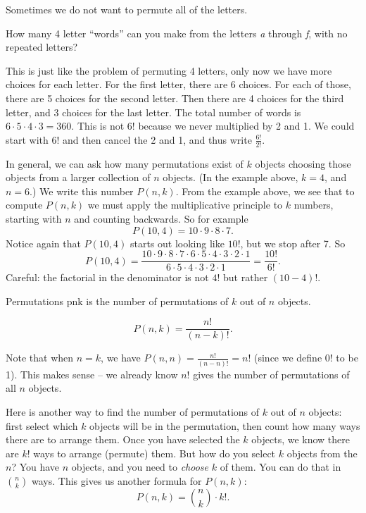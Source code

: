 \documentclass[12pt]{article}
\begin{document}
Sometimes we do not want to permute all of the letters.

\begin{example}
  How many 4 letter ``words'' can you make from the letters \textit{a} through \textit{f}, with no repeated letters?
  \begin{solution}
    This is just like the problem of permuting 4 letters, only now we have more choices for each letter.  For the first letter, there are 6 choices.  For each of those, there are 5 choices for the second letter.  Then there are 4 choices for the third letter, and 3 choices for the last letter.  The total number of words is $6\cdot 5\cdot 4 \cdot 3 = 360$.  This is not $6!$ because we never multiplied by 2 and 1.  We could start with $6!$ and then cancel the 2 and 1, and thus write $\frac{6!}{2!}$.
  \end{solution}
\end{example}

In general, we can ask how many permutations exist of $k$ objects choosing those objects from a larger collection of $n$ objects.  (In the example above, $k = 4$, and $n = 6$.)  We write this number $P(n,k)$.  From the example above, we see that to compute $P(n,k)$ we must apply the multiplicative principle to $k$ numbers, starting with $n$ and counting backwards.  So for example
\[P(10, 4) = 10\cdot 9 \cdot 8 \cdot 7.\]
Notice again that $P(10,4)$ starts out looking like $10!$, but we stop after 7.  So
\[P(10,4) = \frac{10\cdot 9 \cdot 8 \cdot 7 \cdot 6 \cdot 5 \cdot 4 \cdot 3 \cdot 2 \cdot 1}{6 \cdot 5 \cdot 4 \cdot 3 \cdot 2 \cdot 1} = \frac{10!}{6!}.\]
Careful: the factorial in the denominator is not $4!$ but rather $(10-4)!$.

\begin{defbox}{Permutations}
 \gls{pnk} is the number of permutations of $k$ out of $n$ objects.

 \[P(n,k) = \frac{n!}{(n-k)!}.\]
\end{defbox}

Note that when $n = k$, we have $P(n,n) = \frac{n!}{(n-n)!} = n!$ (since we define $0!$ to be 1).  This makes sense -- we already know $n!$ gives the number of permutations of all $n$ objects.

Here is another way to find the number of permutations of $k$ out of $n$ objects: first select which $k$ objects will be in the permutation, then count how many ways there are to arrange them.  Once you have selected the $k$ objects, we know there are $k!$ ways to arrange (permute) them.  But how do you select $k$ objects from the $n$?  You have $n$ objects, and you need to {\em choose} $k$ of them.  You can do that in ${n \choose k}$ ways.  This gives us another formula for $P(n,k)$:
\[P(n,k) = {n \choose k}\cdot k!.\]
\end{document}
